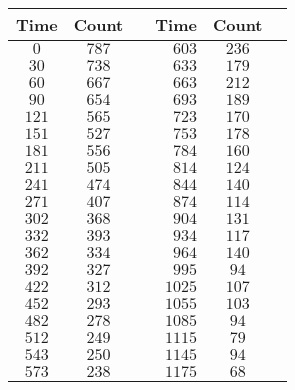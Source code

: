 \begin{tabular}{ccrrcc} \toprule
Time  & Count && Time   & Count \\\midrule
$0$   & $787$ && $603$  & $236$ \\
$30$  & $738$ && $633$  & $179$ \\
$60$  & $667$ && $663$  & $212$ \\
$90$  & $654$ && $693$  & $189$ \\
$121$ & $565$ && $723$  & $170$ \\
$151$ & $527$ && $753$  & $178$ \\
$181$ & $556$ && $784$  & $160$ \\
$211$ & $505$ && $814$  & $124$ \\
$241$ & $474$ && $844$  & $140$ \\
$271$ & $407$ && $874$  & $114$ \\
$302$ & $368$ && $904$  & $131$ \\
$332$ & $393$ && $934$  & $117$ \\
$362$ & $334$ && $964$  & $140$ \\
$392$ & $327$ && $995$  & $94$  \\
$422$ & $312$ && $1025$ & $107$ \\
$452$ & $293$ && $1055$ & $103$ \\
$482$ & $278$ && $1085$ & $94$  \\
$512$ & $249$ && $1115$ & $79$  \\
$543$ & $250$ && $1145$ & $94$  \\
$573$ & $238$ && $1175$ & $68$  \\\bottomrule
\end{tabular}

